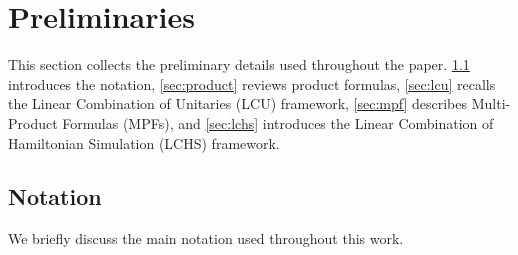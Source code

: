 \documentclass[10pt,reqno]{article}
\numberwithin{equation}{section}
\theoremstyle{plain}
\theoremstyle{definition}
\begin{document}
\section{Preliminaries}\label{sec:prelims}
This section collects the preliminary details used throughout the paper. \cref{sec:notation} introduces the notation, \cref{sec:product} reviews product formulas, \cref{sec:lcu} recalls the Linear Combination of Unitaries (LCU) framework, \cref{sec:mpf} describes Multi-Product Formulas (MPFs), and \cref{sec:lchs} introduces the Linear Combination of Hamiltonian Simulation (LCHS) framework.


\subsection{Notation}\label{sec:notation}
We briefly discuss the main notation used throughout this work.
\end{document}
